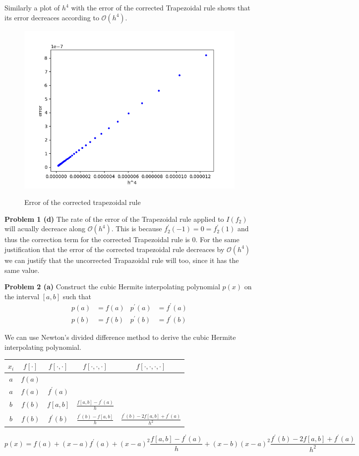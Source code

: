 \documentclass[12pt]{article}
\newcommand{\problem}[1]{\hspace{-4 ex} \large \textbf{Problem #1} }
\begin{document}
	Similarly a plot of $h^4$ with the error of the corrected Trapezoidal rule shows that its error decreaces according to $\mathcal{O}(h^4)$.
	\begin{figure}[H]
		\caption{Error of the corrected trapezoidal rule}
		\includegraphics[width=.75\textwidth]{hw7_p1_fig2}
		\label{p1_T_corrected_err}
		\centering
	\end{figure}

\bigbreak
\problem{1 (d)} The rate of the error of the Trapezoidal rule applied to $I(f_2)$ will acually decreace along $\mathcal{O}(h^4)$. This is because $f_2^\prime(-1)=0= f_2^\prime(1)$ and thus the correction term for the corrected Trapezoidal rule is $0$. For the same justification that the error of the corrected trapezoidal rule decreaces by $\mathcal{O}(h^4)$ we can justify that the uncorrected Trapazoidal rule will too, since it has the same value.

\bigbreak
\problem{2 (a)} Construct the cubic Hermite interpolating polynomial $p(x)$ on the interval $[a,b]$ such that
\begin{align*}
	p(a) &= f(a) & p^\prime(a) &= f^\prime(a) \\
	p(b) &= f(b) & p^\prime(b) &= f^\prime(b)
\end{align*}

	We can use Newton's divided difference method to derive the cubic Hermite interpolating polynomial.
	\begin{center}
		\begin{tabular}{|c|c|c|c|c|}\hline
			$x_i$ & $f[\cdot]$ & $f[\cdot,\cdot]$ & $f[\cdot,\cdot,\cdot]$ & $f[\cdot,\cdot,\cdot,\cdot]$\\ \hline
			$a$ & $f(a)$ & & & \\ \hline
			$a$ & $f(a)$ & $f^\prime(a)$ & & \\ \hline
			$b$ & $f(b)$ & $f[a,b]$ & $\frac{f[a,b] - f^\prime(a)}{h}$ & \\ \hline
			$b$ & $f(b)$ & $f^\prime(b)$ & $\frac{f^\prime(b) - f[a,b]}{h}$ & $\frac{f^\prime(b) - 2f[a,b] + f^\prime(a)}{h^2}$ \\ \hline
		\end{tabular}
	\end{center}
	$$p(x) = f(a) + (x-a)f^\prime(a) + (x-a)^2 \frac{f[a,b]-f^\prime(a)}{h} + (x-b)(x-a)^2 \frac{f^\prime(b) - 2f[a,b] + f^\prime(a)}{h^2}$$
\end{document}
